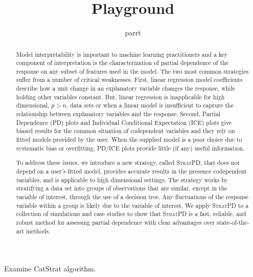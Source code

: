 \documentclass[11pt]{article}
\title{Playground}
\author{parrt}
\newcommand{\spd}{\fontfamily{cmr}\textsc{\small StratPD}}
\begin{document}
\maketitle

\begin{abstract}
Model interpretability is important to machine learning practitioners and a key component of  interpretation is the characterization of partial dependence of the response on any subset of features used in the model. The two most common strategies suffer from a number of critical weaknesses. First,  linear regression model coefficients describe how a unit change in an explanatory variable changes the response, while holding other variables constant. But, linear regression is inapplicable for high dimensional, $p>n$, data sets or when a linear model is insufficient to capture the relationship between explanatory variables and the response. Second, Partial Dependence (PD) plots and Individual Conditional Expectation (ICE) plots give biased results for the common situation of codependent variables and they rely on fitted models provided by the user. When the supplied model is a poor choice due to systematic bias or overfitting, PD/ICE plots provide little (if any) useful information.  

To address these issues, we introduce a new strategy, called \spd{}, that does not depend on a user's fitted model, provides accurate results in the presence codependent variables, and is applicable to high dimensional settings. The strategy works by stratifying a data set into groups of observations that are similar, except in the variable of interest, through the use of a decision tree. Any fluctuations of the response variable within a group is likely due to the variable of interest. We apply \spd{} to a collection of simulations and case studies to show that \spd{} is a fast, reliable, and robust method for assessing partial dependence with clear advantages over state-of-the-art methods. 
\end{abstract}

\pagebreak	
Examine CatStrat algorithm.
\end{document}
